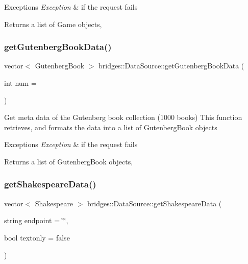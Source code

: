 \begin{DoxyExceptions}{Exceptions}
{\em Exception} & if the request fails\\
\hline
\end{DoxyExceptions}
\begin{DoxyReturn}{Returns}
a list of Game objects, 
\end{DoxyReturn}
\mbox{\label{namespacebridges_1_1_data_source_a8146b00565286727e8206e377d9ff5bd}} 
\subsubsection{\texorpdfstring{get\+Gutenberg\+Book\+Data()}{getGutenbergBookData()}}
{\footnotesize\ttfamily vector$<$ Gutenberg\+Book $>$ bridges\+::\+Data\+Source\+::get\+Gutenberg\+Book\+Data (\begin{DoxyParamCaption}\item[{int}]{num = {} }\end{DoxyParamCaption})}

Get meta data of the Gutenberg book collection (1000 books) This function retrieves, and formats the data into a list of Gutenberg\+Book objects


\begin{DoxyExceptions}{Exceptions}
{\em Exception} & if the request fails\\
\hline
\end{DoxyExceptions}
\begin{DoxyReturn}{Returns}
a list of Gutenberg\+Book objects, 
\end{DoxyReturn}
\mbox{\label{namespacebridges_1_1_data_source_a2aa0d50a0b7bf8cc47c4f92dd1986dc6}} 
\subsubsection{\texorpdfstring{get\+Shakespeare\+Data()}{getShakespeareData()}}
{\footnotesize\ttfamily vector$<$ Shakespeare $>$ bridges\+::\+Data\+Source\+::get\+Shakespeare\+Data (\begin{DoxyParamCaption}\item[{string}]{endpoint = {\ttfamily \char`\"{}\char`\"{}},  }\item[{bool}]{textonly = {\ttfamily false} }\end{DoxyParamCaption})}

